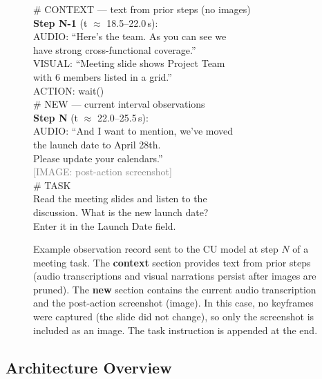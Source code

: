 \documentclass[11pt]{article}
\begin{document}
\begin{figure}[t]
\centering
\begin{tcolorbox}[
  colback=gray!3, colframe=black!40,
  title={\small\bfseries Observation Record --- Step $N$ (Meeting task)},
  fonttitle=\small, coltitle=white, colbacktitle=black!60,
  width=0.95\textwidth, boxrule=0.4pt,
]
\ttfamily\scriptsize
\textcolor{blue!70!black}{\# CONTEXT --- text from prior steps (no images)}\\[2pt]
\textbf{Step N-1} (t $\approx$ 18.5--22.0\,s):\\
\quad AUDIO: ``Here's the team. As you can see we\\
\qquad have strong cross-functional coverage.''\\
\quad VISUAL: ``Meeting slide shows Project Team\\
\qquad with 6 members listed in a grid.''\\
\quad ACTION: wait()\\[4pt]
%
\textcolor{blue!70!black}{\# NEW --- current interval observations}\\[2pt]
\textbf{Step N} (t $\approx$ 22.0--25.5\,s):\\
\quad AUDIO: ``And I want to mention, we've moved\\
\qquad the launch date to April 28th.\\
\qquad Please update your calendars.''\\[2pt]
\quad \textcolor{gray}{[IMAGE: post-action screenshot]}\\[4pt]
%
\textcolor{blue!70!black}{\# TASK}\\
\quad Read the meeting slides and listen to the\\
\quad discussion. What is the new launch date?\\
\quad Enter it in the Launch Date field.
\end{tcolorbox}
\caption{Example observation record sent to the CU model at step $N$ of a meeting task.
The \textbf{context} section provides text from prior steps (audio transcriptions and visual narrations persist after images are pruned).
The \textbf{new} section contains the current audio transcription and the post-action screenshot (image).
In this case, no keyframes were captured (the slide did not change), so only the screenshot is included as an image.
The task instruction is appended at the end.}
\label{fig:obsrecord}
\end{figure}


\subsection{Architecture Overview}
\end{document}

